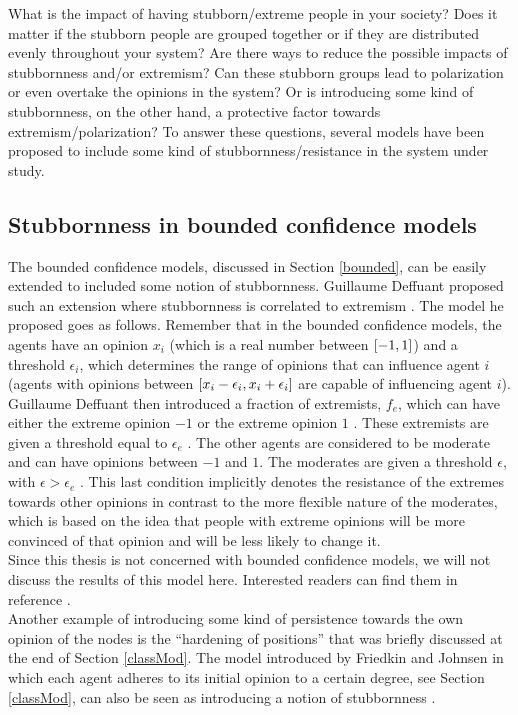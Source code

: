 \documentclass[11 pt , letterpaper , twoside , openright]{book}
\begin{document}
\newline
What is the impact of having stubborn/extreme people in your society? Does it matter if the stubborn people are grouped together or if they are distributed evenly throughout your system? Are there ways to reduce the possible impacts of stubbornness and/or extremism? Can these stubborn groups lead to polarization or even overtake the opinions in the system? Or is introducing some kind of stubbornness, on the other hand, a protective factor towards extremism/polarization? To answer these questions, several models have been proposed to include some kind of stubbornness/resistance in the system under study.

\subsection{Stubbornness in bounded confidence models}

The bounded confidence models, discussed in Section \ref{bounded}, can be easily extended to included some notion of stubbornness. Guillaume Deffuant proposed such an extension where stubbornness is correlated to extremism \cite{Deffuant2006}. The model he proposed goes as follows. Remember that in the bounded confidence models, the agents have an opinion $x_i$ (which is a real number between $\interval{-1}{1}$) and a threshold $\epsilon_i$, which determines the range of opinions that can influence agent $i$ (agents with opinions between $\interval{x_i - \epsilon_i}{x_i + \epsilon_i}$ are capable of influencing agent $i$). Guillaume Deffuant then introduced a fraction of extremists, $f_e$, which can have either the extreme opinion $-1$ or the extreme opinion $1$ \cite{Deffuant2006}. These extremists are given a threshold equal to $\epsilon_e$ \cite{Deffuant2006}. The other agents are considered to be moderate and can have opinions between $-1$ and $1$. The moderates are given a threshold $\epsilon$, with $\epsilon > \epsilon_e$ \cite{Deffuant2006}. This last condition implicitly denotes the resistance of the extremes towards other opinions in contrast to the more flexible nature of the moderates, which is based on the idea that people with extreme opinions will be more convinced of that opinion and will be less likely to change it.\\
\newline
Since this thesis is not concerned with bounded confidence models, we will not discuss the results of this model here. Interested readers can find them in reference \cite{Deffuant2006}. \\
\newline
Another example of introducing some kind of persistence towards the own opinion of the nodes is the ``hardening of positions'' that was briefly discussed at the end of Section \ref{classMod}. The model introduced by Friedkin and Johnsen in which each agent adheres to its initial opinion to a certain degree, see Section \ref{classMod}, can also be seen as introducing a notion of stubbornness \cite{Noorazar2020}.
\end{document}
